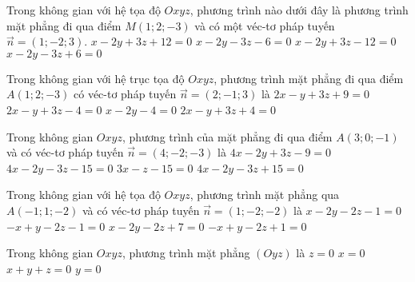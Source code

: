 \begin{ex}%
	Trong không gian với hệ tọa độ $O x y z$, phương trình nào dưới đây là phương trình mặt phẳng đi qua điểm $M(1 ; 2 ;-3)$ và có một véc-tơ pháp tuyến $\vec{n}=(1 ;-2 ; 3)$.
	\choice
	{\True $x-2 y+3 z+12=0$}
	{$x-2 y-3 z-6=0$}
	{$x-2 y+3 z-12=0$}
	{$x-2 y-3 z+6=0$}
\end{ex}
\begin{ex}%
	Trong không gian với hệ trục tọa độ $Oxyz$, phương trình mặt phẳng đi qua điểm $A(1 ; 2 ;-3)$ có véc-tơ pháp tuyến $\vec{n}=(2 ;-1 ; 3)$ là
	\choice
	{\True $2 x-y+3 z+9=0$}
	{$2 x-y+3 z-4=0$}
	{$x-2 y-4=0$}
	{$2 x-y+3 z+4=0$}
\end{ex}

\begin{ex}%
	Trong không gian $O x y z$, phương trình của mặt phẳng đi qua điểm $A(3 ; 0 ;-1)$ và có véc-tơ pháp tuyến $\vec{n}=(4 ;-2 ;-3)$ là
	\choice
	{$4x-2 y+3z-9=0$}
	{\True $4x-2y-3z-15=0$}
	{$3x-z-15=0$}
	{$4x-2y-3z+15=0$}
\end{ex}

\begin{ex}%
	Trong không gian với hệ tọa độ $Oxyz$, phương trình mặt phẳng qua $A(-1 ; 1 ;-2)$ và có véc-tơ  pháp tuyến $\vec{n}=(1 ;-2 ;-2)$ là
	\choice
	{\True $x-2 y-2 z-1=0$}
	{$-x+y-2z-1=0$}
	{$x-2y-2z+7=0$}
	{$-x+y-2z+1=0$}
\end{ex}

\begin{ex}%
	Trong không gian $Oxyz$, phương trình mặt phẳng $(Oyz)$ là
	\choice
	{$z=0$}
	{\True $x=0$}
	{$x+y+z=0$}
	{$y=0$}
\end{ex}

